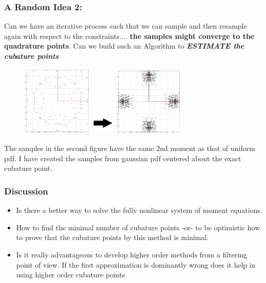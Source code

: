 \documentclass{beamer}
\begin{document}
\begin{frame}
\frametitle{A Random Idea 2:}

\begin{block}{}
Can we have an iterative process such that we can sample and then resample again with respect to the constraints.... {\bf the samples might converge to the quadrature points}. Can we build such an Algorithm to {\bf \emph{ESTIMATE the cubature points}}
\end{block}
   \begin{figure}[thpb]
      \centering
      \includegraphics[width=0.3\textwidth]{intellisampleunifrom.jpg}
      \includegraphics[width=0.1\textwidth]{arrowright.jpg}
      \includegraphics[width=0.3\textwidth]{intellisampleunifrom2.jpg}
      \label{fig:23d4m1}
   \end{figure} 
The samples in the second figure have the same 2nd moment as that of uniform pdf. I have created the samples from gaussian pdf centered about the exact cubature point. 
\end{frame}
\begin{frame}
\frametitle{Discussion}
\begin{itemize}[<+->]
\item Is there a better way to solve the fully nonlinear system of moment equations. 
\item How to find the minimal number of cubature points -or- to be optimistic how to prove that the cubature points by this method is minimal.
\item Is it really advantageous to develop higher order methods from a filtering point of view. If the first approximation is dominantly wrong does it help in using higher order cubature points
\end{itemize}
\end{frame}
\end{document}
